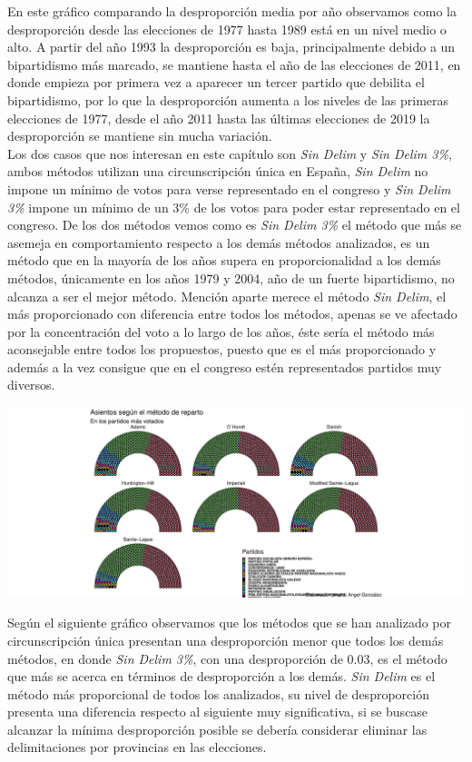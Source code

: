 \documentclass[12pt,a4paper,]{book}
\numberwithin{dummy}{section}
\theoremstyle{ocrenumbox}
\theoremstyle{blacknumex}
\theoremstyle{blacknumbox}
\theoremstyle{ocrenum}
\theoremstyle{ocrenum}
\begin{document}
En este gráfico comparando la desproporción media por año observamos
como la desproporción desde las elecciones de 1977 hasta 1989 está en un
nivel medio o alto. A partir del año 1993 la desproporción es baja,
principalmente debido a un bipartidismo más marcado, se mantiene hasta
el año de las elecciones de 2011, en donde empieza por primera vez a
aparecer un tercer partido que debilita el bipartidismo, por lo que la
desproporción aumenta a los niveles de las primeras elecciones de 1977,
desde el año 2011 hasta las últimas elecciones de 2019 la desproporción
se mantiene sin mucha variación.\\
Los dos casos que nos interesan en este capítulo son \emph{Sin Delim} y
\emph{Sin Delim 3\%}, ambos métodos utilizan una circunscripción única
en España, \emph{Sin Delim} no impone un mínimo de votos para verse
representado en el congreso y \emph{Sin Delim 3\%} impone un mínimo de
un 3\% de los votos para poder estar representado en el congreso. De los
dos métodos vemos como es \emph{Sin Delim 3\%} el método que más se
asemeja en comportamiento respecto a los demás métodos analizados, es un
método que en la mayoría de los años supera en proporcionalidad a los
demás métodos, únicamente en los años 1979 y 2004, año de un fuerte
bipartidismo, no alcanza a ser el mejor método. Mención aparte merece el
método \emph{Sin Delim}, el más proporcionado con diferencia entre todos
los métodos, apenas se ve afectado por la concentración del voto a lo
largo de los años, éste sería el método más aconsejable entre todos los
propuestos, puesto que es el más proporcionado y además a la vez
consigue que en el congreso estén representados partidos muy diversos.

\begin{center}\includegraphics[width=1\linewidth]{figurasR/unnamed-chunk-134-1} \end{center}

Según el siguiente gráfico observamos que los métodos que se han
analizado por circunscripción única presentan una desproporción menor
que todos los demás métodos, en donde \emph{Sin Delim 3\%}, con una
desproporción de 0.03, es el método que más se acerca en términos de
desproporción a los demás. \emph{Sin Delim} es el método más
proporcional de todos los analizados, su nivel de desproporción presenta
una diferencia respecto al siguiente muy significativa, si se buscase
alcanzar la mínima desproporción posible se debería considerar eliminar
las delimitaciones por provincias en las elecciones.
\end{document}
